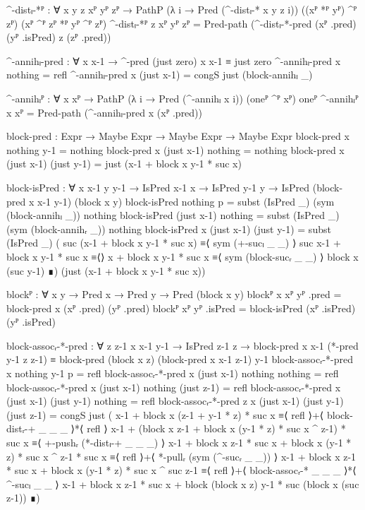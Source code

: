 \begin{code}[hide]
  ^-distₗ-*ᴾ :
    ∀ {x y z} xᴾ yᴾ zᴾ →
    PathP (λ i → Pred (^-distₗ-* x y z i))
      ((xᴾ *ᴾ yᴾ) ^ᴾ zᴾ) (xᴾ ^ᴾ zᴾ *ᴾ yᴾ ^ᴾ zᴾ)
  ^-distₗ-*ᴾ {z} xᴾ yᴾ zᴾ =
    Pred-path (^-distₗ-*-pred (xᴾ .pred) (yᴾ .isPred) z (zᴾ .pred))

  ^-annihₗ-pred : ∀ x x-1 → ^-pred (just zero) x x-1 ≡ just zero
  ^-annihₗ-pred x nothing = refl
  ^-annihₗ-pred x (just x-1) = congS just (block-annihₗ _)

  ^-annihₗᴾ : ∀ {x} xᴾ → PathP (λ i → Pred (^-annihₗ x i)) (oneᴾ ^ᴾ xᴾ) oneᴾ
  ^-annihₗᴾ {x} xᴾ = Pred-path (^-annihₗ-pred x (xᴾ .pred))

  block-pred : Expr → Maybe Expr → Maybe Expr → Maybe Expr
  block-pred x nothing y-1 = nothing
  block-pred x (just x-1) nothing = nothing
  block-pred x (just x-1) (just y-1) = just (x-1 + block x y-1 * suc x)

  block-isPred :
    ∀ {x x-1 y y-1} → IsPred x-1 x → IsPred y-1 y →
    IsPred (block-pred x x-1 y-1) (block x y)
  block-isPred nothing p = subst (IsPred _) (sym (block-annihₗ _)) nothing
  block-isPred (just x-1) nothing =
    subst (IsPred _) (sym (block-annihᵣ _)) nothing
  block-isPred {x} (just x-1) (just y-1) =
    subst (IsPred _)
      ( suc (x-1 + block x y-1 * suc x) ≡⟨ sym (+-sucₗ _ _) ⟩
        suc x-1 + block x y-1 * suc x   ≡⟨⟩
        x + block x y-1 * suc x         ≡⟨ sym (block-sucᵣ _ _) ⟩
        block x (suc y-1)               ∎)
      (just (x-1 + block x y-1 * suc x))

  blockᴾ : ∀ {x y} → Pred x → Pred y → Pred (block x y)
  blockᴾ {x} xᴾ yᴾ .pred = block-pred x (xᴾ .pred) (yᴾ .pred)
  blockᴾ xᴾ yᴾ .isPred = block-isPred (xᴾ .isPred) (yᴾ .isPred)

  block-assocᵣ-*-pred :
    ∀ {z z-1} x x-1 y-1 → IsPred z-1 z →
    block-pred x x-1 (*-pred y-1 z z-1) ≡
    block-pred (block x z) (block-pred x x-1 z-1) y-1
  block-assocᵣ-*-pred x nothing y-1 p = refl
  block-assocᵣ-*-pred x (just x-1) nothing nothing = refl
  block-assocᵣ-*-pred x (just x-1) nothing (just z-1) = refl
  block-assocᵣ-*-pred x (just x-1) (just y-1) nothing = refl
  block-assocᵣ-*-pred {z} x (just x-1) (just y-1) (just z-1) =
    congS just
      ( x-1 + block x (z-1 + y-1 * z) * suc x                                       ≡⟨ refl ⟩+⟨ block-distᵣ-+ _ _ _ ⟩*⟨ refl ⟩
        x-1 + (block x z-1 + block x (y-1 * z) * suc x ^ z-1) * suc x               ≡⟨ +-pushᵣ (*-distₗ-+ _ _ _) ⟩
        x-1 + block x z-1 * suc x + block x (y-1 * z) * suc x ^ z-1 * suc x         ≡⟨ refl ⟩+⟨ *-pullᵣ (sym (^-sucᵣ _ _)) ⟩
        x-1 + block x z-1 * suc x + block x (y-1 * z) * suc x ^ suc z-1             ≡⟨ refl ⟩+⟨ block-assocᵣ-* _ _ _ ⟩*⟨ ^-sucₗ _ _ ⟩
        x-1 + block x z-1 * suc x + block (block x z) y-1 * suc (block x (suc z-1)) ∎)


\end{code}
